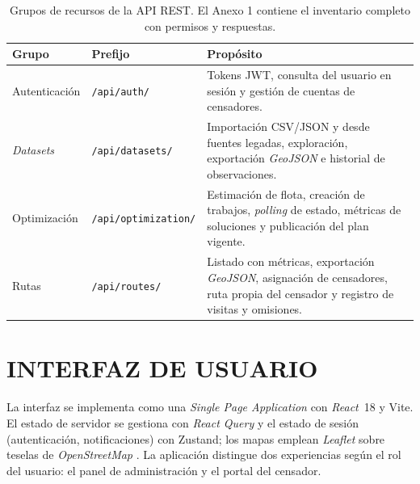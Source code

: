 \begin{table}[H]
  \centering
  \caption{Grupos de recursos de la API REST. El Anexo 1 contiene el inventario completo con permisos y respuestas.}
  \label{tab:endpoints}
  \small
  \begin{tabularx}{\textwidth}{@{}l l X@{}}
    \toprule
    Grupo & Prefijo & Propósito \\
    \midrule
    Autenticación & \texttt{/api/auth/} & Tokens JWT, consulta del usuario en sesión y gestión de cuentas de censadores. \\
    \textit{Datasets} & \texttt{/api/datasets/} & Importación CSV/JSON y desde fuentes legadas, exploración, exportación \textit{GeoJSON} e historial de observaciones. \\
    Optimización & \texttt{/api/optimization/} & Estimación de flota, creación de trabajos, \textit{polling} de estado, métricas de soluciones y publicación del plan vigente. \\
    Rutas & \texttt{/api/routes/} & Listado con métricas, exportación \textit{GeoJSON}, asignación de censadores, ruta propia del censador y registro de visitas y omisiones. \\
    \bottomrule
  \end{tabularx}
\end{table}

\section{INTERFAZ DE USUARIO}
\label{sec:ui}

La interfaz se implementa como una \textit{Single Page Application} con \textit{React}~18
\citep{react} y Vite. El estado de servidor se gestiona con \textit{React Query} y el
estado de sesión (autenticación, notificaciones) con Zustand; los mapas emplean
\textit{Leaflet} \citep{leaflet} sobre teselas de \textit{OpenStreetMap}
\citep{openstreetmap}. La aplicación distingue dos experiencias según el rol del usuario:
el panel de administración y el portal del censador.

